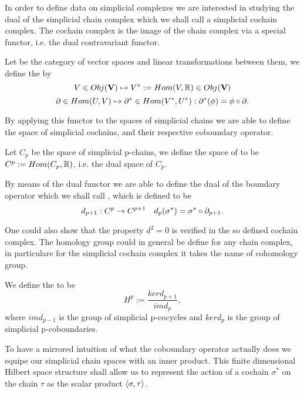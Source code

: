 \documentclass[../1.tex]{subfiles}
\begin{document}
    In order to define data on simplicial complexes we are interested in studying the dual of the simplicial chain complex
    which we shall call a  simplicial cochain complex. The cochain complex is the image of the chain complex via a special functor,
    i.e. the dual contravariant functor.

    \begin{defn}
        Let  be the category of vector spaces and linear transformations between them, we define the  by
        \[ V \in Obj(\textbf{V}) \mapsto V^* := Hom(V,\mathbb{R}) \in Obj(\textbf{V}) \]
        \[ \partial \in Hom(U,V) \mapsto \partial^* \in Hom(V^*,U^*) : \partial^*(\phi)=\phi \circ \partial . \]
    \end{defn}

    By applying this functor to the spaces of simplicial chains we are able to define the space of simplicial cochains, 
    and their respective coboundary operator.
    
    \begin{defn}
        Let $C_p$ be the space of simplicial p-chains, we define the space of  to 
        be $C^p := Hom(C_p, \mathbb{R})$, i.e. the dual space of $C_p$.
    \end{defn}

    \begin{defn}
        By means of the dual functor we are able to define the dual of the boundary operator which we shall call
        , which is defined to be 
        \[ d_{p+1} : C^p \to C^{p+1} \quad d_p(\sigma^*) = \sigma^* \circ \partial_{p+1} .\]
    \end{defn}

    One could also show that the property $d^2 = 0$ is verified in the so defined cochain complex.
    The homology group could in general be define for any chain complex, in particulare for the simplicial cochain
    complex it takes the name of cohomology group.

    \begin{defn}
        We define the  to be 
        \[H^p := \frac{ker d_{p+1}}{im d_{p}},\] 
        where $im d_{p-1}$ is the group of simplicial p-cocycles and
        $ker d_p$ is the group of simplicial p-coboundaries.
    \end{defn}

    To have a mirrored intuition of what the coboundary operator actually does we equipe our simplicial chain spaces with
    an inner product. This finite dimensional Hilbert space structure shall allow us to represent the action of a cochain $\sigma^*$ on the chain $\tau$ 
    as the scalar product $\langle \sigma, \tau \rangle$.
\end{document}
